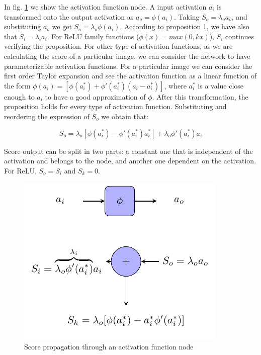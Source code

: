 \documentclass[preprint]{elsarticle}
\theoremstyle{definition} %
\theoremstyle{remark}
\begin{document}
In fig. \ref{fig:score_af} we show the activation function node. A input activation $a_i$ is transformed onto the output activation as $a_o = \phi(a_i)$. Taking $S_o = \lambda_o a_o$, and substituting $a_o$ we get $S_o = \lambda_o \phi(a_i)$. According to proposition 1, we have also that $S_i = \lambda_i a_i$. For ReLU family functions ($\phi(x) = max(0, kx)$), $S_i$ continues verifying the proposition. For other type of activation functions, as we are calculating the score of a particular image, we can consider the network to have parameterizable activation functions. For a particular image we can consider the first order Taylor expansion and see the activation function as a linear function of the form $\phi(a_i) = [\phi(a^*_i) + \phi'(a^*_i)(a_i - a^*_i)]$, where $a^*_i$ is a value close enough to $a_i$ to have a good approximation of $\phi$. After this transformation, the proposition holds for every type of activation function. Substituting and reordering the expression of $S_o$ we obtain that:

\begin{equation}
	S_o = \lambda_o[\phi(a^*_i) - \phi'(a^*_i)a^*_i] + \lambda_o \phi'(a^*_i)a_i
\end{equation}

Score output can be split in two parts: a constant one that is independent of the activation and belongs to the node, and another one dependent on the activation. For ReLU, $S_o = S_i$ and $S_k = 0$.

\begin{figure}[h!]
	\centering
	\includegraphics{figures/score_af.pdf}
	\caption{Score propagation through an activation function node}
	\label{fig:score_af}
\end{figure}
\end{document}

